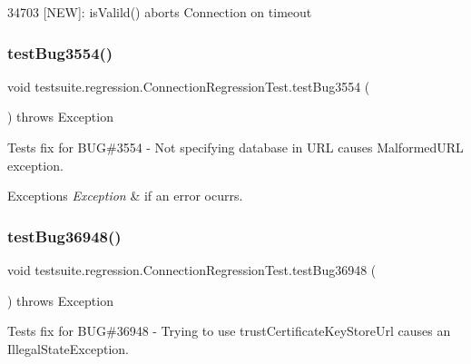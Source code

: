 34703 \mbox{[}N\+EW\mbox{]}\+: is\+Valild() aborts Connection on timeout \mbox{\label{classtestsuite_1_1regression_1_1_connection_regression_test_a37a5b68fc2ee7b632c08744bc7579f29}} 
\subsubsection{\texorpdfstring{test\+Bug3554()}{testBug3554()}}
{\footnotesize\ttfamily void testsuite.\+regression.\+Connection\+Regression\+Test.\+test\+Bug3554 (\begin{DoxyParamCaption}{ }\end{DoxyParamCaption}) throws Exception}

Tests fix for B\+UG\#3554 -\/ Not specifying database in U\+RL causes Malformed\+U\+RL exception.


\begin{DoxyExceptions}{Exceptions}
{\em Exception} & if an error ocurrs. \\
\hline
\end{DoxyExceptions}
\mbox{\label{classtestsuite_1_1regression_1_1_connection_regression_test_a7d937c6b4d025862d519876bc472989b}} 
\subsubsection{\texorpdfstring{test\+Bug36948()}{testBug36948()}}
{\footnotesize\ttfamily void testsuite.\+regression.\+Connection\+Regression\+Test.\+test\+Bug36948 (\begin{DoxyParamCaption}{ }\end{DoxyParamCaption}) throws Exception}

Tests fix for B\+UG\#36948 -\/ Trying to use trust\+Certificate\+Key\+Store\+Url causes an Illegal\+State\+Exception.

